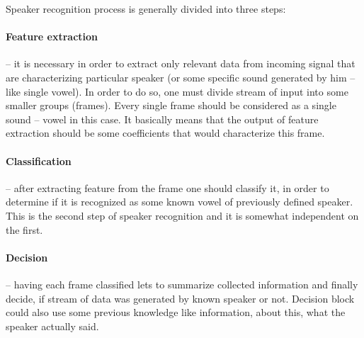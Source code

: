 \documentclass[magister]{dyplom}
\begin{document}
	Speaker recognition process is generally divided into three steps:
	
	\paragraph{Feature extraction} -- it is necessary in order to extract only relevant data from incoming signal that are characterizing particular speaker (or some specific sound generated by him -- like single vowel). In order to do so, one must divide stream of input into some smaller groups (frames). Every single frame should be considered as a single sound -- vowel in this case. It basically means that the output of feature extraction should be some coefficients that would characterize this frame.
	
	\paragraph{Classification} -- after extracting feature from the frame one should classify it, in order to determine if it is recognized as some known vowel of previously defined speaker. This is the second step of speaker recognition and it is somewhat independent on the first.
	
	\paragraph{Decision} -- having each frame classified lets to summarize collected information and finally decide, if stream of data was generated by known speaker or not. Decision block could also use some previous knowledge like information, about this, what the speaker actually said.
\end{document}
